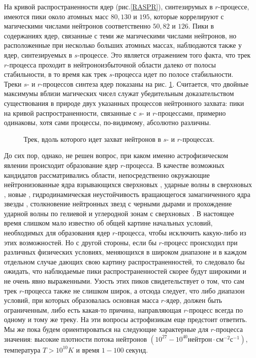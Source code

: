 На кривой распространенности ядер (рис.\ref{RASPR}), синтезирумых в $r$-процессе, имеются пики
около атомных масс $80, 130$ и $195$, которые коррелируют с магическими числами нейтронов соответственно
$50, 82$ и $126$. Пики в содержаниях ядер, связанные с теми же магическими числами
нейтронов, но расположенные при несколько больших атомных массах, наблюдаются также у ядер,
синтезируемых в $s$-процессе. Это является отражением того факта, что трек
$r$-процесса проходит в нейтроноизбыточной области далеко от полосы стабильности,
в то время как трек $s$-процесса идет по полосе стабильности. Треки  $s$- и $r$-процессов синтеза ядер
показаны на рис. \ref{TR}. Считается, что двойные максимумы вблизи магических чисел служат убедительным
доказательством существования в природе двух указанных процессов нейтронного захвата:
пики на кривой распространенности, связанные с $s$- и $r$-процессами, примерно одинаковы,
хотя сами процессы, по-видимому, абсолютно различны.

\begin{figure}
\vspace{18 true cm}
\caption{{Трек, вдоль которого идет захват нейтронов в $s$-  и $r$-процессах.}}
\label{TR}
\end{figure}


До сих пор, однако, не решен вопрос, при каком именно астрофизическом явлении
происходит образование ядер $r$-процесса. В качестве возможных кандидатов рассматривались области,
непосредственно окружающие нейтронизованные ядра взрывающихся сверхновых \cite{burbidge},
ударные волны в сверхновых \cite{sch12, sch24}, новые \cite{sch12, sch39},
гидродинамическая неустойчивость вращающегося замагниченного ядра звезды \cite{sch49, sch56, sch69},
столкновение нейтронных звезд с черными дырами  \cite{sch48}
и прохождение ударной волны по гелиевой и углеродной
зонам с сверхновых \cite{sch34, sch52, sch55, sch86}.
В настоящее время слишком мало известно об общей картине начальных
условий, необходимых для образования ядер $r$-процесса, чтобы исключить какую-либо из этих возможностей.
Но с другой стороны, если бы $r$-процесс происходил при различных физических условиях, меняющихся в
широком диапазоне и в каждом отдельном случае дающих свою картину распространенностей, то следовало бы
ожидать, что наблюдаемые пики распространенностей скорее будут широкими и не очень явно выраженными.
Узость этих пиков свидетельствует о том, что сам трек $r$-процесса также не слишком широк, а отсюда
следует, что либо диапазон условий, при которых образовалась основная масса $r$-ядер, должен быть ограниченным,
либо есть какая-то причина, направляющая $r$-процесс всегда по одному и тому же треку.
На эти вопросы астрофизикам еще предстоит ответить. Мы же пока будем ориентироваться на следующие
характерные для $r$-процесса значения: высокие плотности потока нейтронов
$(10^{27} - 10^{40} нейтрон \cdot см^{-2} с^{-1})$, температура $T>10^{10} K$
и время $1-100 \; секунд$.

